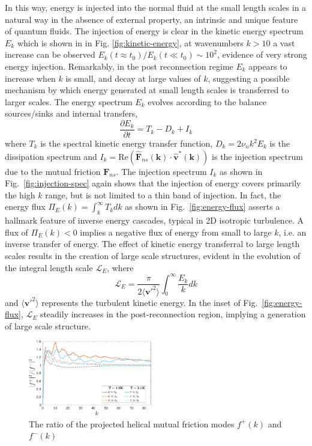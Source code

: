 \documentclass[%
 reprint,
 amsmath,amssymb,
 aps,
 prl,
]{revtex4-2}
\def \v{\mathbf{v}}
\def \k{\mathbf{k}}
\begin{document}
In this way, energy is injected into the normal fluid at the small length scales in a natural way in the absence of external property, an intrinsic and unique feature of quantum fluids. The injection of energy is clear in the kinetic energy spectrum $E_k$ which is shown in in Fig. \ref{fig:kinetic-energy}, at wavenumbers $k>10$ a vast increase can be observed $E_k(t\approx t_0)/E_k(t\ll t_0)\sim10^2$, evidence of very strong energy injection. Remarkably, in the post reconnection regime $E_k$ appears to increase when $k$ is small, and decay at large values of $k$, suggesting a possible mechanism by which energy generated at small length scales is transferred to larger scales. The energy spectrum $E_k$ evolves according to the balance sources/sinks and internal transfers,
\begin{equation}
    \frac{\partial E_k}{\partial t} = T_k - D_k + I_k
\end{equation}
where $T_k$ is the spectral kinetic energy transfer function, $D_k=2\nu_n k^2 E_k$ is the dissipation spectrum and $I_k=\mathrm{Re}(\hat{\mathbf{F}}_{ns}(\k)\cdot\hat{\v}^*(\k))$ is the injection spectrum due to the mutual friction $\mathbf{F}_{ns}$. The injection spectrum $I_k$ as shown in Fig.~\ref{fig:injection-spec} again shows that the injection of energy covers primarily the high $k$ range, but is not limited to a thin band of injection. In fact, the energy flux $\Pi_E(k) = \int_k^{\infty}T_k dk$ as shown in Fig.~\ref{fig:energy-flux} asserts a hallmark feature of inverse energy cascades, typical in 2D isotropic turbulence. A flux of $\Pi_E(k)<0$ implies a negative flux of energy from small to large $k$, i.e. an inverse transfer of energy. The effect of kinetic energy transferral to large length scales results in the creation of large scale structures, evident in the evolution of the integral length scale $\mathcal{L}_{E}$, where
\begin{equation}
    \mathcal{L}_E = \frac{\pi}{2\langle\mathbf{v}'^2\rangle}\int_0^{\infty}\frac{E_k}{k}dk
\end{equation}
and $\langle\mathbf{v}'^2\rangle$ represents the turbulent kinetic energy. In the inset of Fig.~\ref{fig:energy-flux}, $\mathcal{L}_E$ steadily increases in the post-reconnection region, implying a generation of large scale structure. 

\begin{figure}[b]
    \centering
    \includegraphics*[width=0.48\textwidth]{fmfDecompFig.pdf}
    \caption{The ratio of the projected helical mutual friction modes $f^+(k)$ and $f^-(k)$}
    \label{fig:mutual-friction-decomp}
\end{figure}
\end{document}
